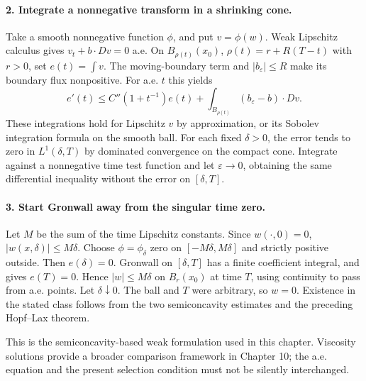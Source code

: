 \begin{expandedproof}
\paragraph{2. Integrate a nonnegative transform in a shrinking cone.}
Take a smooth nonnegative function $\phi$, and put $v=\phi(w)$.
Weak Lipschitz calculus gives $v_t+b\cdot Dv=0$ a.e.
On $B_{\rho(t)}(x_0)$, $\rho(t)=r+R(T-t)$ with $r>0$, set
$e(t)=\int v$. The moving-boundary term and $|b_\varepsilon|\leq R$
make its boundary flux nonpositive. For a.e. $t$ this yields
\[
 e'(t)\leq C''(1+t^{-1})e(t)
       +\int_{B_{\rho(t)}}(b_\varepsilon-b)\cdot Dv.
\]
These integrations hold for Lipschitz $v$ by approximation, or its
Sobolev integration formula on the smooth ball.
For each fixed $\delta>0$, the error tends to zero in $L^1(\delta,T)$
by dominated convergence on the compact cone.
Integrate against a nonnegative time test function and let
$\varepsilon\to0$, obtaining the same differential inequality without
the error on $[\delta,T]$.

\paragraph{3. Start Gronwall away from the singular time zero.}
Let $M$ be the sum of the time Lipschitz constants.
Since $w(\cdot,0)=0$, $|w(x,\delta)|\leq M\delta$.
Choose $\phi=\phi_\delta$ zero on $[-M\delta,M\delta]$ and strictly
positive outside. Then $e(\delta)=0$.
Gronwall on $[\delta,T]$ has a finite coefficient integral, and gives
$e(T)=0$. Hence $|w|\leq M\delta$ on $B_r(x_0)$ at time $T$,
using continuity to pass from a.e. points.
Let $\delta\downarrow0$. The ball and $T$ were arbitrary, so $w=0$.
Existence in the stated class follows from the two semiconcavity
estimates and the preceding Hopf--Lax theorem.
\end{expandedproof}
\Needspace{45mm}

This is the semiconcavity-based weak formulation used in this chapter.
Viscosity solutions provide a broader comparison framework in Chapter 10;
the a.e. equation and the present selection condition must not be
silently interchanged.
